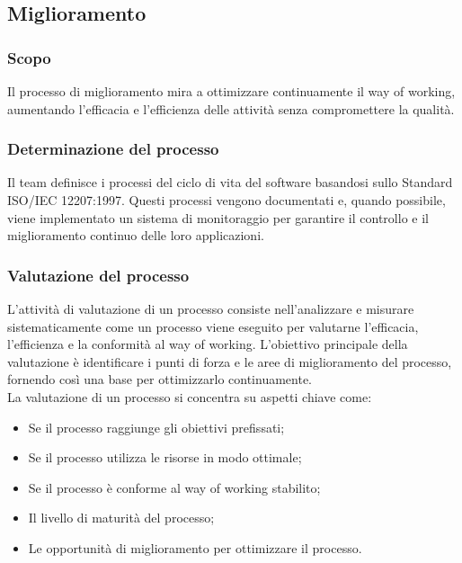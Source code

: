 \subsection{Miglioramento}
\subsubsection{Scopo}
Il processo di miglioramento mira a ottimizzare continuamente il way of working, aumentando l’efficacia e l’efficienza delle attività senza compromettere la qualità.

\subsubsection{Determinazione del processo}
Il team definisce i processi del ciclo di vita del software basandosi sullo Standard ISO/IEC 12207:1997. Questi processi vengono documentati e, quando possibile, viene implementato un sistema di monitoraggio per garantire il controllo e il miglioramento continuo delle loro applicazioni.

\subsubsection{Valutazione del processo}
L'attività di valutazione di un processo consiste nell'analizzare e misurare sistematicamente come un processo viene eseguito per valutarne l'efficacia, l'efficienza e la conformità al way of working. L'obiettivo principale della valutazione è identificare i punti di forza e le aree di miglioramento del processo, fornendo così una base per ottimizzarlo continuamente. \\
La valutazione di un processo si concentra su aspetti chiave come:
\begin{itemize}
    \item Se il processo raggiunge gli obiettivi prefissati;
    \item Se il processo utilizza le risorse in modo ottimale;
    \item Se il processo è conforme al way of working stabilito;
    \item Il livello di maturità del processo;
    \item Le opportunità di miglioramento per ottimizzare il processo.
\end{itemize}

